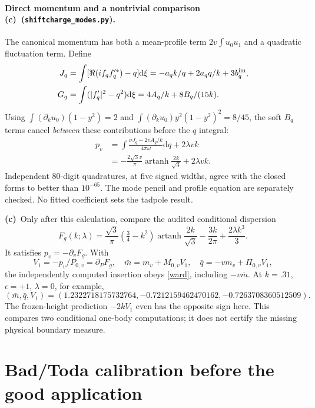 \documentclass[11pt,a4paper]{article}
\newcommand{\C}{\textbf{(c)}\ }
\newcommand{\dd}{\mathrm d}
\newcommand{\file}[1]{\nolinkurl{#1}}
\newcommand{\modes}{\file{shiftcharge_modes.py}}
\begin{document}
\paragraph{Direct momentum and a nontrivial comparison \C (\modes).}
The canonical momentum has both a mean-profile term $2v\int u_0u_1$ and
a quadratic fluctuation term. Define
\begin{align}
 J_q&=\int[\Re(if_qf_q'^*)-q]\dd\xi
       =-a_q k/q+2a_q q/k+3b_q^{\rm im},\\
 G_q&=\int(|f_q'|^2-q^2)\dd\xi
       =4A_q/k+8B_q/(15k).
\end{align}
Using $\int(\partial_k u_0)(1-y^2)=2$ and
$\int(\partial_k u_0)y^2(1-y^2)^2=8/45$, the soft $B_q$ terms cancel
\emph{between} these contributions before the $q$ integral:
\begin{align}
 p_v&=\int\frac{\nu J_q-2vA_q/k}{4\pi\omega}\dd q+2\lambda vk\\
 &=-\frac{2\sqrt3 v}{\pi}\operatorname{artanh}\frac{2k}{\sqrt3}
                       +2\lambda vk.\label{directP}
\end{align}
Independent 80-digit quadratures, at five signed widths, agree with the
closed forms to better than $10^{-65}$. The mode pencil and profile equation
are separately checked. No fitted coefficient sets the tadpole result.

\C Only after this calculation, compare the audited conditional dispersion
\begin{equation}
 F_g(k;\lambda)=\frac{\sqrt3}{\pi}(\tfrac34-k^2)
 \operatorname{artanh}\frac{2k}{\sqrt3}-\frac{3k}{2\pi}
                          +\frac{2\lambda k^3}{3}.\label{Fg}
\end{equation}
It satisfies $p_v=-\partial_v F_g$. With
\begin{equation}
 V_1=-p_v/P_{0,v}=\partial_PF_g,\quad
 \bar m=m_v+M_{0,v}V_1,\quad
 \bar q=-v m_v+\Pi_{0,v}V_1,\label{directfixed}
\end{equation}
the independently computed insertion obeys \eqref{ward}, including
$-v\bar m$. At $k=.31$, $\epsilon=+1$, $\lambda=0$, for example,
\begin{equation}
 (\bar m,\bar q,V_1)=(1.2322718175732764,
                 -0.7212159462470162,-0.7263708360512509).
\end{equation}
The frozen-height prediction $-2kV_1$ even has the opposite sign here.
This compares two conditional one-body computations; it does not certify
the missing physical boundary measure.

\section{Bad/Toda calibration before the good application}
\end{document}
